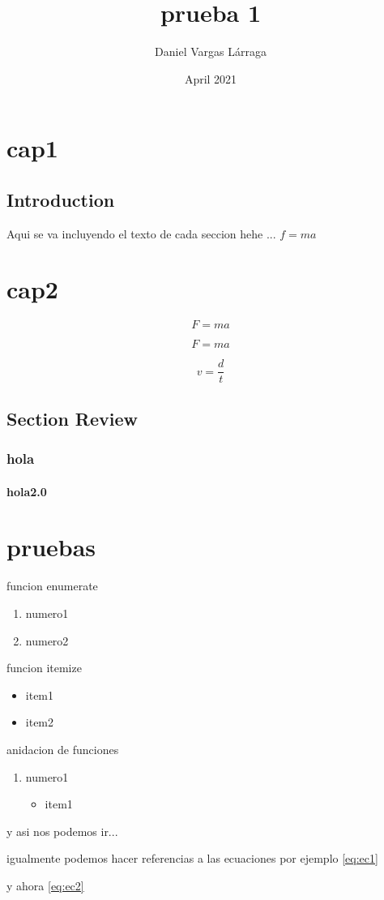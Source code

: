 \documentclass{book}
\title{prueba 1}
\author{Daniel Vargas Lárraga }
\date{April 2021}
\begin{document}
\maketitle

\chapter{cap1}

\section{Introduction}
Aqui se va incluyendo el texto de cada seccion hehe ... $f= m a$


\chapter{cap2}

\[F = m a\]

\begin{equation}
    F=ma
    \label{eq:ec1}
\end{equation}

\begin{equation}
    v=\frac{d}{t}
    \label{eq:ec2}
\end{equation}

\section{Section Review}
\subsection{hola}
\subsubsection{hola2.0}

\chapter{pruebas}

funcion enumerate
\begin{enumerate}
    \item numero1
    \item numero2
\end{enumerate}
funcion itemize

\begin{itemize}
    \item item1
    \item item2
\end{itemize}

anidacion de funciones
    \begin{enumerate}
        \item numero1
        \begin{itemize}
            \item item1
        \end{itemize}
    \end{enumerate}

y asi nos podemos ir...

igualmente podemos hacer referencias a las ecuaciones por ejemplo \ref{eq:ec1}

y ahora \ref{eq:ec2}
\end{document}
